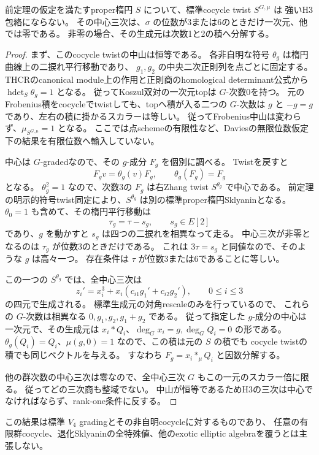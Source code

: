 \begin{theorem}
\label{thm:cocycle-sklyanin-exclusion}
前定理の仮定を満たすproper楕円 $S$ について、標準cocycle twist $S^{G,\mu}$ は
強いH3包絡にならない。
その中心三次は、$\sigma$ の位数が3または6のときだけ一次元、他では零である。
非零の場合、その生成元は次数1と2の積へ分解する。
\end{theorem}
\begin{proof}
まず、このcocycle twistの中山は恒等である。
各非自明な符号 $\theta_g$ は楕円曲線上の二捩れ平行移動であり、
$g_1,g_2$ の中央二次正則列を点ごとに固定する。
THCRのcanonical module上の作用と正則商のhomological determinant公式から
$\operatorname{hdet}_S\theta_g=1$ となる。
従ってKoszul双対の一次元topは $G$-次数0を持つ。
元のFrobenius積をcocycleでtwistしても、topへ積が入る二つの $G$-次数は
$g$ と $-g=g$ であり、左右の積に掛かるスカラーは等しい。
従ってFrobenius中山は変わらず、$\mu_{S^{G,\mu}}=1$ となる。
ここでは点schemeの有限性など、Daviesの無限位数仮定下の結果を有限位数へ輸入していない。

中心は $G$-gradedなので、その $g$-成分 $F_g$ を個別に調べる。
Twistを戻すと
\[
 F_gv=\theta_g(v)F_g,\qquad \theta_g(F_g)=F_g
\]
となる。
$\theta_g^2=1$ なので、次数3の $F_g$ は右Zhang twist $S^{\theta_g}$ で中心である。
前定理の明示的符号twist同定により、$S^{\theta_g}$ は別の標準proper楕円Sklyaninとなる。
$\theta_0=1$ も含めて、その楕円平行移動は
\[
 \tau_g=\tau-s_g,\qquad s_g\in E[2]
\]
であり、$g$ を動かすと $s_g$ は四つの二捩れを相異なって走る。
中心三次が非零となるのは $\tau_g$ が位数3のときだけである。
これは $3\tau=s_g$ と同値なので、そのような $g$ は高々一つ。
存在条件は $\tau$ が位数3または6であることに等しい。

この一つの $S^{\theta_g}$ では、全中心三次は
\[
 z_i'=x_i^3+x_i(c_{i1}g_1'+c_{i2}g_2'),\qquad0\le i\le3
\]
の四元で生成される。
標準生成元の対角rescaleのみを行っているので、
これらの $G$-次数は相異なる $0,g_1,g_2,g_1+g_2$ である。
従って指定した $g$-成分の中心は一次元で、その生成元は
$x_i*Q_i$、$\deg_Gx_i=g,\deg_GQ_i=0$ の形である。
$\theta_g(Q_i)=Q_i$、$\mu(g,0)=1$ なので、この積は元の $S$ の積でも
cocycle twistの積でも同じベクトルを与える。
すなわち $F_g=x_i*_{\mu}Q_i$ と因数分解する。

他の群次数の中心三次は零なので、全中心三次 $G$ もこの一元のスカラー倍に限る。
従ってどの三次商も整域でない。
中山が恒等であるためH3の三次は中心でなければならず、rank-one条件に反する。
\end{proof}

この結果は標準 $V_4$ gradingとその非自明cocycleに対するものであり、
任意の有限群cocycle、退化Sklyaninの全特殊値、他のexotic elliptic algebraを覆うとは主張しない。
